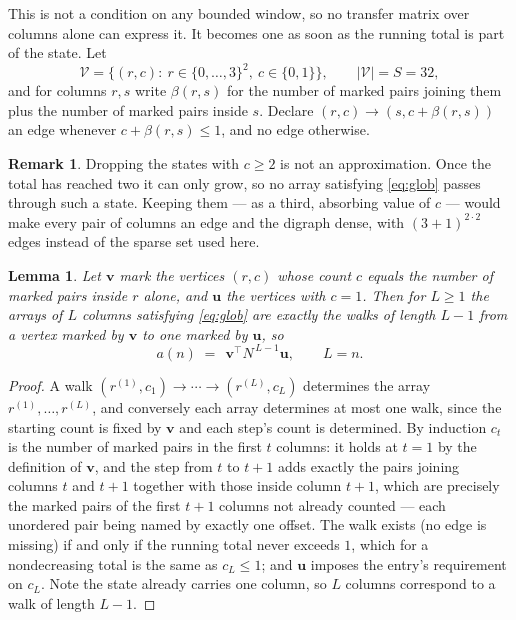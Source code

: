 \documentclass[11pt,a4paper]{article}
\theoremstyle{plain}
\newtheorem{lemma}[theorem]{Lemma}
\theoremstyle{definition}
\newtheorem{remark}[theorem]{Remark}
\begin{document}
This is not a condition on any bounded window, so no transfer matrix over columns alone can
express it. It becomes one as soon as the running total is part of the state. Let
\[
\mathcal V=\bigl\{(r,c):\ r\in\{0,\dots,3\}^{2},\ c\in\{0,1\}\bigr\},
\qquad |\mathcal V|=S=32,
\]
and for columns $r,s$ write $\beta(r,s)$ for the number of marked pairs joining them plus the
number of marked pairs inside $s$. Declare $(r,c)\to(s,c+\beta(r,s))$ an edge whenever
$c+\beta(r,s)\le1$, and no edge otherwise.

\begin{remark}
Dropping the states with $c\ge2$ is not an approximation. Once the total has reached two it
can only grow, so no array satisfying \eqref{eq:glob} passes through such a state. Keeping
them --- as a third, absorbing value of $c$ --- would make every pair of columns an edge and
the digraph dense, with $(3+1)^{2\cdot2}$ edges instead of the sparse set used here.
\end{remark}

\begin{lemma}\label{lem:walk}
Let $\mathbf{v}$ mark the vertices $(r,c)$ whose count $c$ equals the number of marked pairs
inside $r$ alone, and $\mathbf{u}$ the vertices with $c=1$. Then for $L\ge1$ the arrays
of $L$ columns satisfying \eqref{eq:glob} are exactly the walks of length $L-1$ from a
vertex marked by $\mathbf{v}$ to one marked by $\mathbf{u}$, so
\[
a(n)\;=\;\,\mathbf{v}^{\!\top}N^{\,L-1}\mathbf{u},\qquad L=n .
\]
\end{lemma}

\begin{proof}
A walk $(r^{(1)},c_1)\to\cdots\to(r^{(L)},c_L)$ determines the array
$r^{(1)},\dots,r^{(L)}$, and conversely each array determines at most one walk, since the
starting count is fixed by $\mathbf{v}$ and each step's count is determined. By induction
$c_t$ is the number of marked pairs in the first $t$ columns: it holds at $t=1$ by the
definition of $\mathbf{v}$, and the step from $t$ to $t+1$ adds exactly the pairs joining
columns $t$ and $t+1$ together with those inside column $t+1$, which are precisely the marked
pairs of the first $t+1$ columns not already counted --- each unordered pair being named by
exactly one offset. The walk exists (no edge is missing) if and only if the running total
never exceeds $1$, which for a nondecreasing total is the same as $c_L\le1$; and
$\mathbf{u}$ imposes the entry's requirement on $c_L$. Note the state already carries one
column, so $L$ columns correspond to a walk of length $L-1$.
\end{proof}
\end{document}
